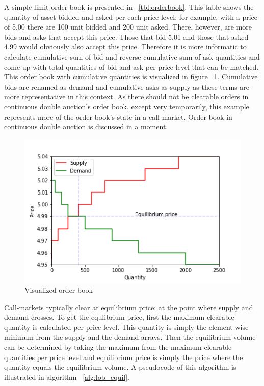
A simple limit order book is presented in ~\ref{tbl:orderbook}. This table shows the
quantity of asset bidded and asked per each price level: for example, with a price of 5.00
there are 100 unit bidded and 200 unit asked. There, however, are more bids and asks that 
accept this price. Those that bid 5.01 and those that asked 4.99 would obviously also accept
this price. Therefore it is more informatic to calculate cumulative sum of bid and reverse cumulative sum of 
ask quantities and come up with total quantities of bid and ask per price level that can be matched.  
This order book with cumulative quantities is visualized in figure ~\ref{fig:lob_visual}. Cumulative bids
are renamed as demand and cumulative asks as supply as these terms are more representative in this context.
As there should not be clearable orders in continuous 
double auction's order book, except very temporarily, 
this example represents more of the order book's state in a call-market. Order book
in continuous double auction is discussed in a moment.

\begin{figure}
    \begin{center}  
        \includegraphics{plots/orderbook_visualized.png}
        \caption{Visualized order book}
        \label{fig:lob_visual}
    \end{center}
\end{figure}

Call-markets typically clear at equilibrium price: at the point where
supply and demand crosses. 
To get the equlibrium price, first the maximum clearable quantity
is calculated per price level. This quantity is simply the element-wise
minimum from the supply and the demand arrays. Then the equilibrium volume
can be determined by taking the maximum from the maximum clearable quantities
per price level and equilibrium price is simply the price where the quantity
equals the equilibrium volume. A pseudocode of this algorithm is illustrated in 
algorithm ~\ref{alg:lob_equil}.

